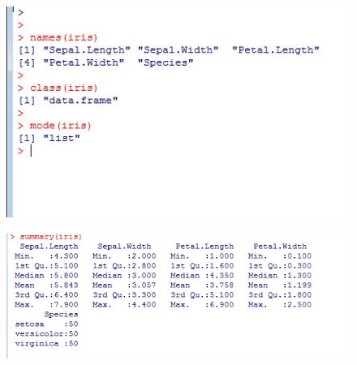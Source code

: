 \documentclass{beamer}
\begin{document}
 	\begin{frame}
 		\begin{figure}  
 			\includegraphics[width=0.7\linewidth]{images/irisinspect}     
 		\end{figure}
 	\end{frame}   
 	\begin{frame}
 		\begin{figure}
 			\centering
 			\includegraphics[width=0.7\linewidth]{images/irissummary}
 			\caption{}
 			\label{fig:irissummary}
 		\end{figure}
 	\end{frame}   
 	
\end{document}
